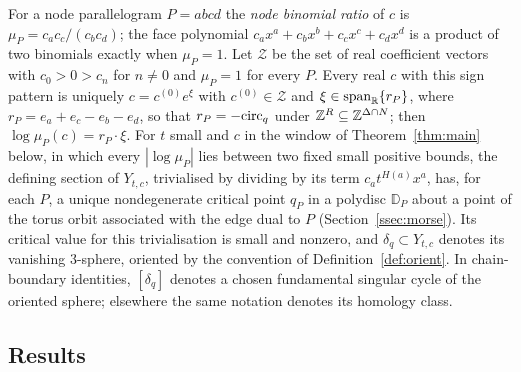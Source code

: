 For a node parallelogram $P=abcd$ the \emph{node binomial ratio} of $c$ is $\mu_P=c_ac_c/(c_bc_d)$; the face polynomial
$c_ax^a+c_bx^b+c_cx^c+c_dx^d$ is a product of two binomials exactly when $\mu_P=1$. Let $\mathcal Z$ be the set of real
coefficient vectors with $c_0>0>c_n$ for $n\neq0$ and $\mu_P=1$ for every $P$. Every real $c$ with this sign pattern is
uniquely $c=c^{(0)}e^{\xi}$ with $c^{(0)}\in\mathcal Z$ and $\xi\in\operatorname{span}_\mathbb R\{r_P\}$, where
$r_P=e_a+e_c-e_b-e_d$, so that $r_P=-\mathrm{circ}_q$ under $\mathbb Z^R\subseteq\mathbb Z^{\Delta\cap N}$; then $\log\mu_P(c)=r_P\cdot\xi$. For $t$ small and $c$ in the window of Theorem~\ref{thm:main} below,
in which every $|\log\mu_P|$ lies between two fixed small positive bounds, the defining section of $Y_{t,c}$,
trivialised by dividing by its term $c_at^{H(a)}x^a$, has, for each $P$, a unique nondegenerate critical point $q_P$ in a polydisc $\mathbb D_P$ about a point of the torus orbit
associated with the edge dual to $P$ (Section~\ref{ssec:morse}). Its critical value for this trivialisation is small and nonzero, and $\delta_q\subset Y_{t,c}$
denotes its vanishing $3$-sphere, oriented by the convention of Definition~\ref{def:orient}.
In chain-boundary identities, $[\delta_q]$ denotes a chosen fundamental singular cycle of the oriented sphere;
elsewhere the same notation denotes its homology class.

\subsection{Results}\label{ssec:results}

